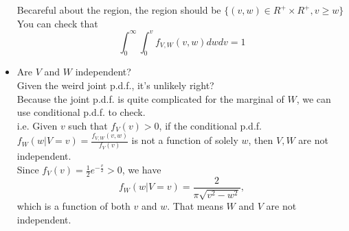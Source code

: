 \documentclass[12pt]{article}
\begin{document}
\begin{itemize}
\[   \]
   Becareful about the region, the region should be \( \{(v,w) \in R^+ \times R^+, v \geq w\}\) 
   \\ 
   You can check that 
   \[
      \int_0^\infty \int_0^v f_{V,W}(v,w)dwdv = 1  
   \]
    \item Are \(V\) and \(W\) independent? \\  
   Given the weird joint p.d.f., it's unlikely right?\\
   Because the joint p.d.f. is quite complicated for the marginal of \(W\), we can use conditional p.d.f. to check. 
   \\i.e. Given \(v\) such that \(f_V(v) > 0\), if the conditional p.d.f. \(f_{W}(w | V = v) = \frac{f_{V,W}(v,w)}{f_V(v)}\) is not a function of solely \(w\), then \(V,W\) are  not independent. 
   \\Since \(f_V(v) = \frac{1}{2}e^{-\frac{v}{2}} > 0\), we have 
   \[
      f_W(w| V = v) = \frac{2}{\pi \sqrt{v^{2}-w^2} }, 
   \] 
   which is a function of both \(v\) and \(w\). That means \(W\) and \(V\) are not independent.  
\end{itemize}
\end{document}
